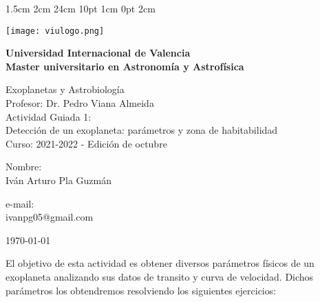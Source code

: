 \documentclass[12pt,letterpaper]{article}
\begin{document}
\setmargins{2.5cm}      
{1.5cm}                     
{2cm}  
{24cm}                    
{10pt}                          
{1cm}                          
{0pt}                             
{2cm}
\begin{titlepage}
\changefontsizes{18pt}
\texttt{[image: viulogo.png]}
\vspace{1.5cm}
\begin{center}
\begin{large}
\textbf{
Universidad Internacional de Valencia\\
\vspace{0.3cm}
Master universitario en Astronomía y Astrofísica}\\
\vspace*{1.5cm}
\begin{large}
Exoplanetas y Astrobiología\\
\vspace{0.5cm}
Profesor: Dr. Pedro Viana Almeida\\
\vspace{0.5cm}
Actividad Guiada 1:\\
\vspace{0.1cm}
Detección de un exoplaneta: parámetros y zona de 
habitabilidad\\
\vspace{0.5cm}
Curso: 2021-2022 - Edición de octubre\\
\end{large}
\end{large}
\vspace{5cm}
\begin{minipage}{0.60\linewidth}
Nombre:\\
Iván Arturo Pla Guzmán\\
\end{minipage}
\vspace*{-0.5cm}
\begin{minipage}{0.30\linewidth}
e-mail:\\
ivanpg05@gmail.com\\
\end{minipage}

\vspace*{0.2in}
\end{center}
\begin{flushright}
\today
\end{flushright}
\end{titlepage}
El objetivo de esta actividad es obtener diversos parámetros físicos de un exoplaneta analizando sus datos de transito y curva de velocidad. Dichos parámetros los obtendremos resolviendo los siguientes ejercicios:\\
\end{document}
